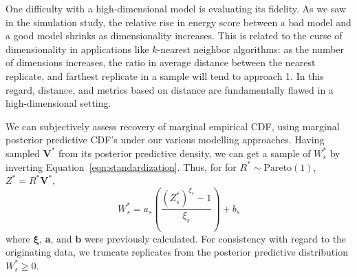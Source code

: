 One difficulty with a high-dimensional model is evaluating its fidelity.  As we saw in the simulation
    study, the relative rise in energy score between a bad model and a good model shrinks as
    dimensionality increases.  This is related to the curse of dimensionality in applications like
    $k$-nearest neighbor algorithms: as the number of dimensions increases, the ratio in average
    distance between the nearest replicate, and farthest replicate in a sample will tend to approach
    1.  In this regard, distance, and metrics based on distance are fundamentally flawed in a 
    high-dimensional setting.

We can subjectively assess recovery of marginal empirical CDF, using marginal
    posterior predictive CDF's under our various modelling approaches.
    Having sampled $\bm{V}^{*}$ from its posterior predictive density, we can get a sample of $W_s^*$
    by inverting Equation~\eqref{eqn:standardization}.  Thus, for for $R^*\sim\text{Pareto}(1)$, 
    $Z^* = R^*\bm{V}^*$,
    \begin{equation*}
        W_s^* = a_s\left(\frac{(Z_s^*)^{\xi_s} - 1}{\xi_s}\right) + b_s
    \end{equation*}
    where $\bm{\xi}$, $\bm{a}$, and $\bm{b}$ were previously calculated.  
    For consistency with regard to the originating data, we truncate replicates 
    from the posterior predictive distribution $W_{s}^* \geq 0$.

